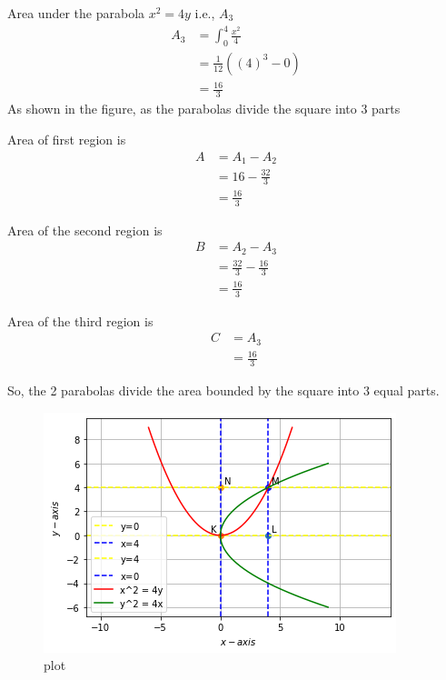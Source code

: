 Area under the parabola $x^2 = 4y$ i.e., $A_3$
\begin{align}
    A_3 &= \int_0^4 \frac{x^2}{4}\\
    &= \frac{1}{12}((4)^3 - 0)\\
    &= \frac{16}{3}
\end{align}
As shown in the figure, as the parabolas divide the square into 3 parts

Area of first region is
\begin{align}
    A &= A_1 - A_2\\
    &= 16 - \frac{32}{3} \\
    &= \frac{16}{3}
\end{align}

Area of the second region is
\begin{align}
    B &= A_2 - A_3\\
    &= \frac{32}{3} - \frac{16}{3}\\
    &= \frac{16}{3}
\end{align}

Area of the third region is
\begin{align}
    C &= A_3\\
    &= \frac{16}{3}
\end{align}

So, the 2 parabolas divide the area bounded by the square into 3 equal parts.
\begin{figure}[ht]
\centering
\includegraphics[width=\columnwidth]{solutions/oct/2/37/Figure/AS_5.png}
\caption{plot}
\label{2/37/fig:my_label}
\end{figure}

